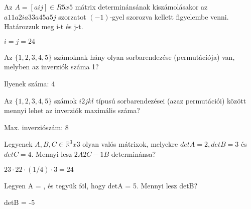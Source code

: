 \begin{frame}
  \begin{tcolorbox}[title={7/2. -R-}]
    Az $A = [aij] \in R5x5$ mátrix determinánsának kiszámolásakor az $a11a2ia33a45a5j$ szorzatot $(-1)$-gyel szorozva kellett figyelembe venni. Határozzuk meg i-t és j-t.
  \tcblower

    \mmedskip 
    
    $i = j =
2 4$
  \end{tcolorbox}
\end{frame}


\begin{frame}
  \begin{tcolorbox}[title={7/3. -Q-}]
    Az $\{1,2,3,4,5\}$ számoknak hány olyan sorbarendezése (permutációja) van, melyben az inverziók száma 1?
  \tcblower

    \mmedskip 
    
     Ilyenek száma: 4
  \end{tcolorbox}
\end{frame}


\begin{frame}
  \begin{tcolorbox}[title={7/4. -Q-}]
    Az $\{1,2,3,4,5\}$ számok $i2jkl$ típusú sorbarendezései (azaz permutációi) között mennyi lehet az inverziók maximális száma?
  \tcblower

    \mmedskip 
    Max. inverziószám: 8
  \end{tcolorbox}
\end{frame}

\begin{frame}
  \begin{tcolorbox}[title={7/5. -N-}]
    Legyenek $A,B,C \in \mathbb{R}^3x3$ olyan valós mátrixok, melyekre $detA = 2, detB = 3$ és $detC = 4$. Mennyi lesz $2A2C-1B$ determinánsa?
  \tcblower

    \mmedskip 
    
     $23  \cdot 22  \cdot (1/4) \cdot 3 = 24$
  \end{tcolorbox}
\end{frame}

\begin{frame}
  \begin{tcolorbox}[title={7/6. -R-}]
    Legyen A =
, és
tegyük föl, hogy detA = 5. Mennyi lesz detB?

  \tcblower

    \mmedskip 
    
     detB = -5
  \end{tcolorbox}
\end{frame}


